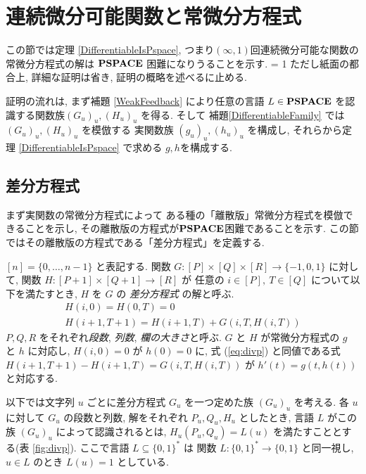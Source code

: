 \section{連続微分可能関数と常微分方程式}
\label{section:differentiable}

この節では定理 \ref{DifferentiableIsPspace},
つまり$(\infty, 1)$回連続微分可能な関数の常微分方程式の解は
$\mathbf{PSPACE}$ 困難になりうることを示す.
\ifnum \proc = 1
ただし紙面の都合上, 詳細な証明は省き, 証明の概略を述べるに止める.
\fi

証明の流れは, まず補題 \ref{WeakFeedback} により任意の言語
$L \in \mathbf{PSPACE}$ を認識する関数族$(G_u)_u, (H_u)_u$ を得る.
そして 補題\ref{DifferentiableFamily} では $(G_u)_u, (H_u)_u$ を模倣する
実関数族 $(g_u)_u, (h_u)_u$ を構成し,
それらから定理 \ref{DifferentiableIsPspace} で求める $g, h$を構成する.


\subsection{差分方程式}
\label{section:divp}

まず実関数の常微分方程式によって
ある種の「離散版」常微分方程式を模倣できることを示し, 
その離散版の方程式が$\mathbf{PSPACE}$困難であることを示す.
この節ではその離散版の方程式である「差分方程式」を定義する.

$[n] = \{0, \dots , n-1\}$ と表記する.
関数 $G \colon [P] \times [Q] \times [R] \to \{-1, 0, 1\}$ に対して,
関数 $H \colon [P + 1] \times [Q+1] \to [R]$ が
任意の $i \in [P],\ T \in [Q]$ について以下を満たすとき,
$H$ を $G$ の \emph{差分方程式} の解と呼ぶ.
\begin{gather}
   H(i, 0) = H(0, T) = 0 
\\
   H(i + 1, T + 1) = H(i+1, T) + G(i, T, H(i, T))  \label{eq:divp}
\end{gather}
$P, Q, R$ をそれぞれ\emph{段数}, \emph{列数}, \emph{欄の大きさ}と呼ぶ.
$G$ と $H$ が常微分方程式の $g$ と $h$ に対応し,
$H(i, 0) = 0$ が $h(0) = 0$ に,
式 (\ref{eq:divp}) と同値である式 $H(i + 1, T + 1) - H(i+1, T) = G(i, T, H(i, T))$
が $h'(t) = g(t, h(t))$ と対応する.

以下では文字列 $u$ ごとに差分方程式 $G _u$ を一つ定めた族 $(G _u) _u$ を考える. 
各 $u$ に対して $G_u$ の段数と列数, 解をそれぞれ $P_u, Q_u, H_u$ としたとき,
言語 $L$ がこの族 $(G_u)_u$ によって認識されるとは,
$H_u(P_u, Q_u) = L(u)$ を満たすこととする(表 \ref{fig:divp}).
ここで言語 $L \subseteq \{0, 1\} ^*$ は
関数 $L \colon \{0, 1\} ^* \to \{0, 1\}$ と同一視し, 
$u \in L$ のとき $L (u) = 1$ としている. 


